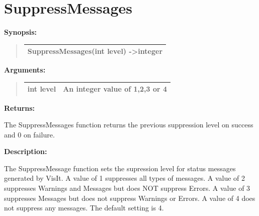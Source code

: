 \documentclass[letterpaper,10pt,english]{sphinxmanual}
\begin{document}
\section{SuppressMessages}
\label{functions:suppressmessages}
\begin{DUlineblock}{0em}
\item[] \textbf{Synopsis:}
\end{DUlineblock}
\begin{quote}

\begin{tabulary}{\linewidth}{|L|}
\hline

SuppressMessages(int level) -\textgreater{}integer
\\
\hline\end{tabulary}

\end{quote}

\begin{DUlineblock}{0em}
\item[] 
\item[] \textbf{Arguments:}
\end{DUlineblock}
\begin{quote}

\begin{tabulary}{\linewidth}{|L|L|}
\hline

int level
 & 
An integer value of 1,2,3 or 4
\\
\hline\end{tabulary}

\end{quote}

\begin{DUlineblock}{0em}
\item[] 
\item[] \textbf{Returns:}
\item[] The SuppressMessages function returns the previous suppression level on success and 0 on failure.
\item[] 
\item[] \textbf{Description:}
\item[] The SuppressMessage function sets the supression level for status messages
generated by VisIt.  A value of 1 suppresses all types of messages. A value
of 2 suppresses Warnings and Messages but does NOT suppress Errors.
A value of 3 suppresses Messages but does not suppress Warnings or Errors.
A value of 4 does not suppress any messages. The default setting is 4.
\end{DUlineblock}
\end{document}
